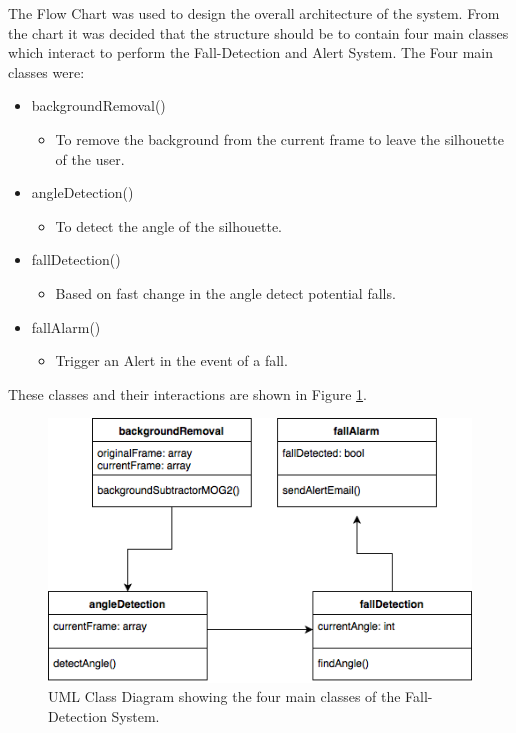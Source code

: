 \documentclass[11pt,a4paper]{report}
\begin{document}
\pagebreak
\noindent
The Flow Chart was used to design the overall architecture of the system. From the chart it was decided that the structure should be to contain four main classes which interact to perform the Fall-Detection and Alert System. The Four main classes were:
\begin{itemize}
\item backgroundRemoval()
	\begin{itemize}
	\item To remove the background from the current frame to leave the silhouette of the user.
	\end{itemize}
\item angleDetection()
	\begin{itemize}
	\item To detect the angle of the silhouette.
	\end{itemize}
\item fallDetection()
	\begin{itemize}
	\item Based on fast change in the angle detect potential falls.
	\end{itemize}
\item fallAlarm()
	\begin{itemize}
	\item Trigger an Alert in the event of a fall.
	\end{itemize}
\end{itemize}

These classes and their interactions are shown in Figure \ref{fig:UMLClassDiagram}.

\begin{figure}[H]
 \centering
 \includegraphics[scale = 0.5]{UMLClassDiagram.png}
 \caption[UML Class Diagram]{UML Class Diagram showing the four main classes of the Fall-Detection System.}
 \label{fig:UMLClassDiagram}
\end{figure}
\end{document}
